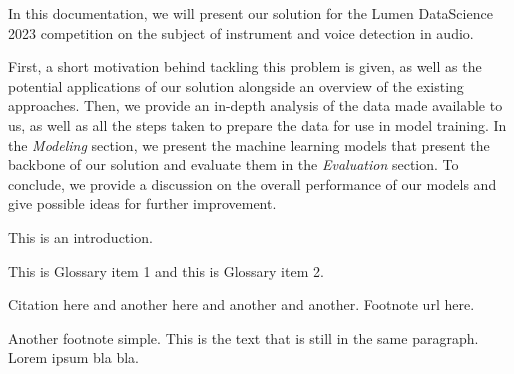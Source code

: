 
In this documentation, we will present our solution for the Lumen DataScience 2023 competition on the subject of instrument and voice detection in audio. 

First, a short motivation behind tackling this problem is given, as well as the potential applications of our solution alongside an overview of the existing approaches. Then, we provide an in-depth analysis of the data made available to us, as well as all the steps taken to prepare the data for use in model training. In the \textit{Modeling} section, we present the machine learning models that present the backbone of our solution and evaluate them in the \textit{Evaluation} section. To conclude, we provide a discussion on the overall performance of our models  and give possible ideas for further improvement. \clearpage



This is an introduction.

This is \gls{Glossary item 1} and this is \gls{Glossary item 2}.

Citation here\cite{Li2019} and another here  and another  and another. Footnote url here.

Another footnote simple. This is the text that is still in the same paragraph. Lorem ipsum bla bla.
